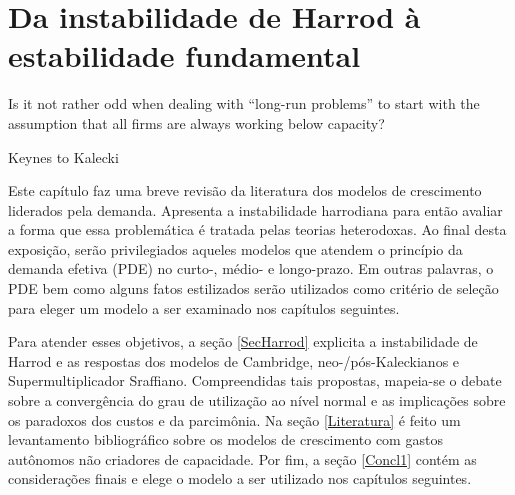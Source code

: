 \chapter{Da instabilidade de Harrod à estabilidade fundamental}

\epigraph{Is it not rather odd when dealing with ``long-run problems'' to start with the assumption that all firms are always working below capacity?}{Keynes to Kalecki}


Este capítulo faz uma breve revisão da literatura dos modelos de crescimento liderados pela demanda. Apresenta a instabilidade harrodiana para então avaliar a forma que essa problemática é tratada pelas teorias heterodoxas.
Ao final desta exposição, serão privilegiados aqueles modelos que atendem o princípio da demanda efetiva (PDE) no curto-, médio- e longo-prazo. Em outras palavras, o PDE bem como alguns fatos estilizados serão utilizados como critério de seleção para eleger um modelo a ser examinado nos capítulos seguintes.


Para atender esses objetivos, a seção \ref{SecHarrod} explicita a instabilidade de Harrod e as respostas dos modelos de Cambridge, neo-/pós-Kaleckianos e Supermultiplicador Sraffiano. Compreendidas tais propostas, mapeia-se o debate sobre a convergência do grau de utilização ao nível normal e as implicações sobre os paradoxos dos custos e da parcimônia. Na seção \ref{Literatura} é feito um levantamento bibliográfico sobre os modelos de crescimento com gastos autônomos não criadores de capacidade. Por fim, a seção \ref{Concl1} contém as considerações finais e elege o modelo a ser utilizado nos capítulos seguintes.






